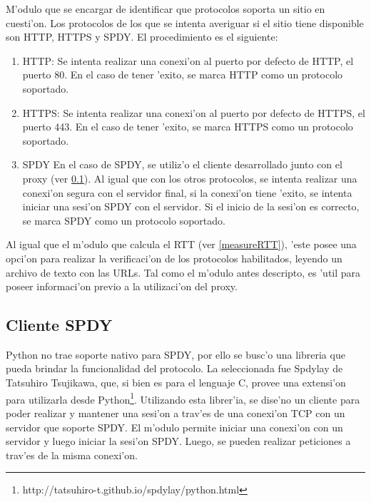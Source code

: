 M'odulo que se encargar de identificar que protocolos soporta un sitio en cuesti'on. Los protocolos de los que se intenta averiguar si el sitio tiene disponible son HTTP, HTTPS y SPDY. El procedimiento es el siguiente: 
\begin{enumerate}
\item HTTP:
Se intenta realizar una conexi'on al puerto por defecto de HTTP, el puerto 80. En el caso de tener 'exito, se marca HTTP como un protocolo soportado.
\item HTTPS:
Se intenta realizar una conexi'on al puerto por defecto de HTTPS, el puerto 443. En el caso de tener 'exito, se marca HTTPS como un protocolo soportado.
\item SPDY
En el caso de SPDY, se utiliz'o el cliente desarrollado junto con el proxy (ver \ref{clienteSPDY}). Al igual que con los otros protocolos, se intenta realizar una conexi'on segura con el servidor final, si la conexi'on tiene 'exito, se intenta iniciar una sesi'on SPDY con el servidor. Si el inicio de la sesi'on es correcto, se marca SPDY como un protocolo soportado.
\end{enumerate}

Al igual que el m'odulo que calcula el RTT (ver \ref{measureRTT}), 'este posee una opci'on para realizar la verificaci'on de los protocolos habilitados, leyendo un archivo de texto con las URLs. Tal como el m'odulo antes descripto, es 'util para poseer informaci'on previo a la utilizaci'on del proxy.

\subsection{Cliente SPDY}
\label{clienteSPDY}

Python no trae soporte nativo para SPDY, por ello se busc'o una libreria que pueda brindar la funcionalidad del protocolo. La seleccionada fue Spdylay \citep{spdylay} de Tatsuhiro Tsujikawa, que, si bien es para el lenguaje C, provee una extensi'on para utilizarla desde Python\footnote{http://tatsuhiro-t.github.io/spdylay/python.html}. Utilizando esta librer'ia, se dise'no un cliente para poder realizar y mantener una sesi'on a trav'es de una conexi'on TCP con un servidor que soporte SPDY. El m'odulo permite iniciar una conexi'on con un servidor y luego iniciar la sesi'on SPDY. Luego, se pueden realizar peticiones a trav'es de la misma conexi'on.